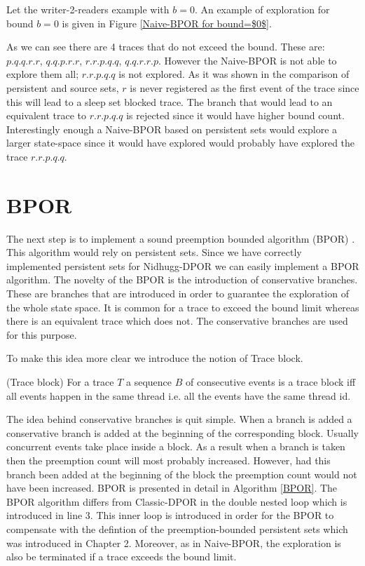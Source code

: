 Let the writer-2-readers example with $b=0$. An example of exploration for bound $b=0$ is given in Figure \ref{Naive-BPOR for bound=$0$}. 

\label{Vanilla0}    

As we can see there are 4 traces that do not exceed the bound. These are:
$p.q.q.r.r$, $q.q.p.r.r$, $r.r.p.q.q$, $q.q.r.r.p$.
However the Naive-BPOR is not able to explore them all; $r.r.p.q.q$ is not explored.
As it was shown in the comparison of persistent and source sets, $r$ is never registered as the first event of the trace
since this will lead to a sleep set blocked trace. The branch that would lead to an equivalent trace to $r.r.p.q.q$ is rejected
since it would have higher bound count. Interestingly enough a Naive-BPOR based on persistent sets would explore a larger state-space since
it would have explored would probably have explored the trace $r.r.p.q.q$.

\section{BPOR}

The next step is to implement a sound preemption bounded algorithm (BPOR) \cite{BPOR}. This algorithm would rely on
persistent sets. Since we have correctly implemented persistent sets for Nidhugg-DPOR we can easily implement a BPOR
algorithm. The novelty of the BPOR is the introduction of conservative branches. These are branches that are introduced
in order to guarantee the exploration of the whole state space. It is common for a trace to exceed the bound limit
whereas there is an equivalent trace which does not. The conservative branches are used for this purpose.

To make this idea more clear we introduce the notion of Trace block.
\begin{definition}{(Trace block)}
For a trace $T$ a sequence $B$ of consecutive events is a trace block iff all events happen in the same thread i.e. all
the events have the same thread id.
\end{definition}

The idea behind conservative branches is quit simple. When a branch is added a conservative branch is added at the
beginning of the corresponding block. Usually concurrent events take place inside a block. As a result when a branch is
taken then the preemption count will most probably increased. However, had this branch been added at the beginning of
the block the preemption count would not have been increased. BPOR is presented in detail in Algorithm \ref{BPOR}. The
BPOR algorithm differs from Classic-DPOR in the double nested loop which is introduced in line 3. This inner loop is
introduced in order for the BPOR to compensate with the defintion of the preemption-bounded persistent sets which was
introduced in Chapter 2. Moreover, as in Naive-BPOR, the exploration is also be terminated if a trace exceeds the bound
limit.

